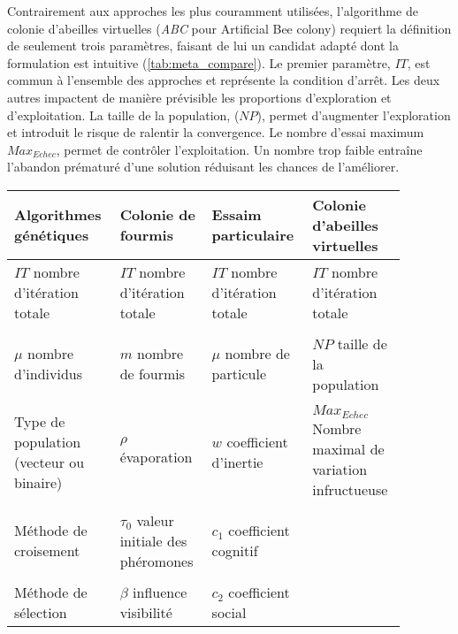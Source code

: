 Contrairement aux approches les plus couramment utilisées, l’algorithme de
colonie d’abeilles virtuelles (\textit{ABC} pour Artificial Bee colony) requiert la
définition de seulement trois paramètres, faisant de lui un candidat adapté dont
la formulation est intuitive (\autoref{tab:meta_compare}). Le premier paramètre,
$IT$, est commun à l’ensemble des approches et représente la condition d’arrêt.
Les deux autres impactent de manière prévisible les proportions d’exploration et
d’exploitation. La taille de la population, ($NP$), permet d’augmenter
l’exploration et introduit le risque de ralentir la convergence. Le nombre
d’essai maximum $Max_{Echec}$, permet de contrôler l’exploitation. Un nombre
trop faible entraîne l’abandon prématuré d’une solution réduisant les chances de
l’améliorer.

\begin{table}
\centering
\small
\begin{tabular}{L{0.22\linewidth} L{0.22\linewidth} L{0.22\linewidth} L{0.22\linewidth}}
    \toprule
    \textbf{Algorithmes génétiques}          & \textbf{Colonie de fourmis}                &  \textbf{Essaim particulaire}   & \textbf{Colonie d’abeilles virtuelles}                  \\
    \midrule
    $IT$ nombre d’itération totale           & $IT$ nombre d’itération totale             & $IT$ nombre d’itération totale  & $IT$ nombre d’itération totale                          \\
    \\
    $\mu$ nombre d’individus                 & $m$ nombre de fourmis                      & $\mu$ nombre de particule       & $NP$ taille de la population                            \\
    \\
    Type de population (vecteur ou binaire)  & $\rho$ évaporation                         & $w$ coefficient d’inertie       & $Max_{Echec}$ Nombre maximal de variation infructueuse  \\
    \\
    Méthode de croisement                    & $\tau_{0}$ valeur initiale des phéromones  & $c_{1}$ coefficient cognitif    &                                                         \\
    \\
    Méthode de sélection                     & $\beta$ influence visibilité               & $c_{2}$ coefficient social      &                                                         \\

\end{tabular}
\end{table}
